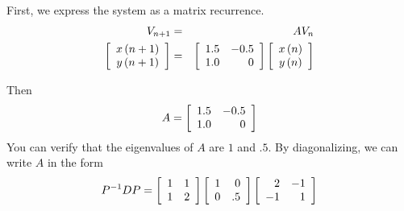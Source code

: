 \begin{solution}
First, we express the system as a matrix recurrence. 
\begin{eqnarray*}
V_{n+1} &=& AV_{n}\\
\left[
\begin{array}{c}
x\left( n+1\right) \\
y\left( n+1\right)
\end{array}
\right] &=&\left[ 
\begin{array}{rr}
1.5 & -0.5 \\
1.0 & 0
\end{array}
\right] \left[
\begin{array}{c}
x\left( n\right) \\
y\left( n\right)
\end{array}
\right]
\end{eqnarray*}

Then
\begin{equation*}
A
=
\left[ 
\begin{array}{rr}
1.5 & -0.5 \\
1.0 & 0
\end{array}
\right]
\end{equation*}
You can verify that the eigenvalues of $A$ are $1$ and $.5$. By diagonalizing, we can write $A$ in the form
\begin{equation*}
P^{-1} D P =
\left[
\begin{array}{rr}
1 & 1 \\
1 & 2
\end{array}
\right] \left[
\begin{array}{rr}
1 & 0 \\
0 & .5
\end{array}
\right] \left[
\begin{array}{rr}
2 & -1 \\
-1 & 1
\end{array}
\right]
\end{equation*}


\end{solution}
